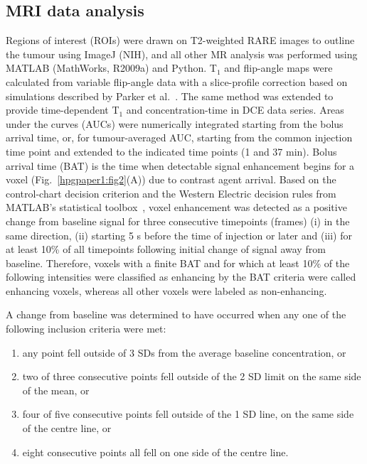 \subsection{MRI data analysis}

Regions of interest (ROIs) were drawn on T2-weighted \acs{RARE} images to outline the tumour using ImageJ (NIH), and all other MR analysis was performed using MATLAB (MathWorks, R2009a) and Python.
T$_1$ and flip-angle maps were calculated from variable flip-angle data with a slice-profile correction based on simulations described by Parker et al.~\cite{Parker:2001wj}.
The same method was extended to provide time-dependent T$_1$ and concentration-time in DCE data series.
Areas under the curves (AUCs) were numerically integrated starting from the bolus arrival time, or, for tumour-averaged AUC, starting from the common injection time point and extended to the indicated time points (1 and 37 min).
Bolus arrival time (BAT) is the time when detectable signal enhancement begins for a voxel (Fig.~\ref{hpgpaper1:fig2}(A)) due to contrast agent arrival.
Based on the control-chart decision criterion and the Western Electric decision rules from MATLAB’s statistical toolbox~\cite{Shewhart:1931tq}, voxel enhancement was detected as a positive change from baseline signal for three consecutive timepoints (frames) (i) in the same direction, (ii) starting 5 s before the time of injection or later and (iii) for at least 10\% of all timepoints following initial change of signal away from baseline.
Therefore, voxels with a finite \acs{BAT} and for which at least 10\% of the following intensities were classified as enhancing by the \acs{BAT} criteria were called enhancing voxels, whereas all other voxels were labeled as non-enhancing.

A change from baseline was determined to have occurred
when any one of the following inclusion criteria were met:

\begin{enumerate}
	\item any point fell outside of 3 SDs from the average baseline concentration, or
	\item two of three consecutive points fell outside of the 2 SD limit on the same side of the mean, or
	\item four of five consecutive points fell outside of the 1 SD line, on the same side of the centre line, or
	\item eight consecutive points all fell on one side of the centre line.
\end{enumerate}

